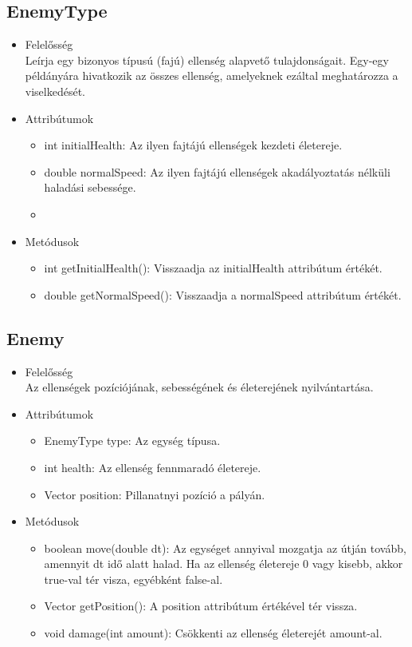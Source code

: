 \subsection{EnemyType}
\begin{itemize}
\item Felelősség\\
Leírja egy bizonyos típusú (fajú) ellenség alapvető tulajdonságait. Egy-egy példányára hivatkozik az összes ellenség, amelyeknek ezáltal meghatározza a viselkedését.
\item Attribútumok\\
	\begin{itemize}
		\item int initialHealth: Az ilyen fajtájú ellenségek kezdeti életereje.
		\item double normalSpeed: Az ilyen fajtájú ellenségek akadályoztatás nélküli haladási sebessége.
		\item {}
	\end{itemize}
\item Metódusok\\
	\begin{itemize}
		\item int getInitialHealth(): Visszaadja az initialHealth attribútum értékét.
		\item double getNormalSpeed(): Visszaadja a normalSpeed attribútum értékét.
	\end{itemize}
\end{itemize}


\subsection{Enemy}
\begin{itemize}
\item Felelősség\\
Az ellenségek pozíciójának, sebességének és életerejének nyilvántartása.
\item Attribútumok\\
	\begin{itemize}
		\item EnemyType type: Az egység típusa.
		\item int health: Az ellenség fennmaradó életereje.
		\item Vector position: Pillanatnyi pozíció a pályán.
	\end{itemize}
\item Metódusok\\
	\begin{itemize}
		\item boolean move(double dt): Az egységet annyival mozgatja az útján tovább, amennyit dt idő alatt halad. Ha az ellenség életereje 0 vagy kisebb, akkor true-val tér visza, egyébként false-al.
		\item Vector getPosition(): A position attribútum értékével tér vissza.
		\item void damage(int amount): Csökkenti az ellenség életerejét amount-al.
	\end{itemize}
\end{itemize}



